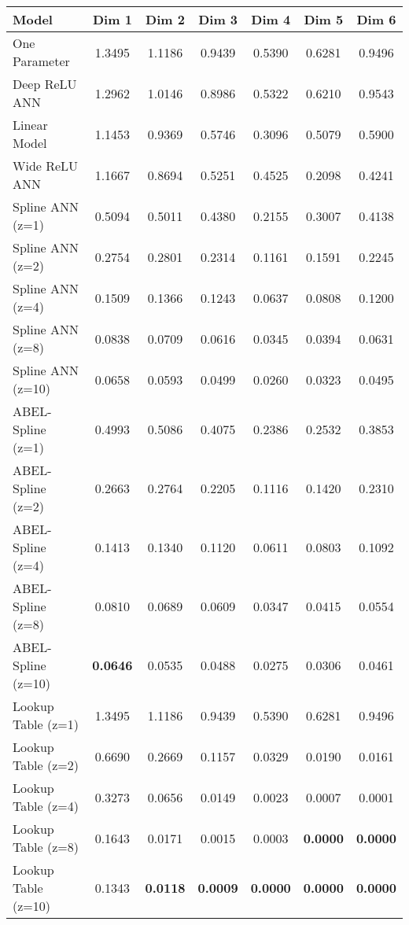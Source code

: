 \begin{table}
\begin{tabular}{|l|c|c|c|c|c|c|}
\hline
Model & Dim 1 & Dim 2 & Dim 3 & Dim 4 & Dim 5 & Dim 6 \\ \hline
One Parameter & 1.3495 & 1.1186 & 0.9439 & 0.5390 & 0.6281 & 0.9496 \\ \hline
Deep ReLU ANN & 1.2962 & 1.0146 & 0.8986 & 0.5322 & 0.6210 & 0.9543 \\ \hline
Linear Model & 1.1453 & 0.9369 & 0.5746 & 0.3096 & 0.5079 & 0.5900 \\ \hline
Wide ReLU ANN & 1.1667 & 0.8694 & 0.5251 & 0.4525 & 0.2098 & 0.4241 \\ \hline
Spline ANN (z=1) & 0.5094 & 0.5011 & 0.4380 & 0.2155 & 0.3007 & 0.4138 \\ \hline
Spline ANN (z=2) & 0.2754 & 0.2801 & 0.2314 & 0.1161 & 0.1591 & 0.2245 \\ \hline
Spline ANN (z=4) & 0.1509 & 0.1366 & 0.1243 & 0.0637 & 0.0808 & 0.1200 \\ \hline
Spline ANN (z=8) & 0.0838 & 0.0709 & 0.0616 & 0.0345 & 0.0394 & 0.0631 \\ \hline
Spline ANN (z=10) & 0.0658 & 0.0593 & 0.0499 & 0.0260 & 0.0323 & 0.0495 \\ \hline
ABEL-Spline (z=1) & 0.4993 & 0.5086 & 0.4075 & 0.2386 & 0.2532 & 0.3853 \\ \hline
ABEL-Spline (z=2) & 0.2663 & 0.2764 & 0.2205 & 0.1116 & 0.1420 & 0.2310 \\ \hline
ABEL-Spline (z=4) & 0.1413 & 0.1340 & 0.1120 & 0.0611 & 0.0803 & 0.1092 \\ \hline
ABEL-Spline (z=8) & 0.0810 & 0.0689 & 0.0609 & 0.0347 & 0.0415 & 0.0554 \\ \hline
ABEL-Spline (z=10) & \textbf{0.0646} & 0.0535 & 0.0488 & 0.0275 & 0.0306 & 0.0461 \\ \hline
Lookup Table (z=1) & 1.3495 & 1.1186 & 0.9439 & 0.5390 & 0.6281 & 0.9496 \\ \hline
Lookup Table (z=2) & 0.6690 & 0.2669 & 0.1157 & 0.0329 & 0.0190 & 0.0161 \\ \hline
Lookup Table (z=4) & 0.3273 & 0.0656 & 0.0149 & 0.0023 & 0.0007 & 0.0001 \\ \hline
Lookup Table (z=8) & 0.1643 & 0.0171 & 0.0015 & 0.0003 & \textbf{0.0000} & \textbf{0.0000} \\ \hline
Lookup Table (z=10) & 0.1343 & \textbf{0.0118} & \textbf{0.0009} & \textbf{0.0000} & \textbf{0.0000} & \textbf{0.0000} \\ \hline
\end{tabular}
\end{table}
